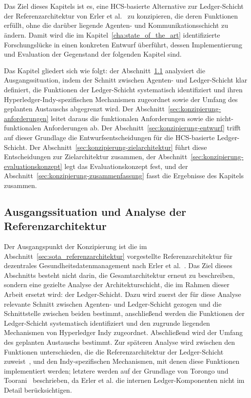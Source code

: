 \chapter{}
\label{cha:konzept}

Das Ziel dieses Kapitels ist es, eine HCS-basierte Alternative zur Ledger-Schicht der Referenzarchitektur von Erler et al.~\cite{erler2023} zu konzipieren, die deren Funktionen erfüllt, ohne die darüber liegende Agenten- und Kommunikationsschicht zu ändern. Damit wird die im Kapitel~\ref{cha:state_of_the_art} identifizierte Forschungslücke in einen konkreten Entwurf überführt, dessen Implementierung und Evaluation der Gegenstand der folgenden Kapitel sind.

Das Kapitel gliedert sich wie folgt: der Abschnitt~\ref{sec:konzipierung-referenzarchitektur} analysiert die Ausgangssituation, indem der Schnitt zwischen Agenten- und Ledger-Schicht klar definiert, die Funktionen der Ledger-Schicht systematisch identifiziert und ihren Hyperledger-Indy-spezifischen Mechanismen zugeordnet sowie der Umfang des geplanten Austauschs abgegrenzt wird. Der Abschnitt~\ref{sec:konzipierung-anforderungen} leitet daraus die funktionalen Anforderungen sowie die nicht-funktionalen Anforderungen ab. Der Abschnitt~\ref{sec:konzipierung-entwurf} trifft auf dieser Grundlage die Entwurfsentscheidungen für die HCS-basierte Ledger-Schicht. Der Abschnitt~\ref{sec:konzipierung-zielarchitektur} führt diese Entscheidungen zur Zielarchitektur zusammen, der Abschnitt~\ref{sec:konzipierung-evaluationskonzept} legt das Evaluationskonzept fest, und der Abschnitt~\ref{sec:konzipierung-zusammenfassung} fasst die Ergebnisse des Kapitels zusammen.

\section{Ausgangssituation und Analyse der Referenzarchitektur}
\label{sec:konzipierung-referenzarchitektur}

Der Ausgangspunkt der Konzipierung ist die im Abschnitt~\ref{sec:sota_referenzarchitektur} vorgestellte Referenzarchitektur für dezentrales Gesundheitsdatenmanagement nach Erler et al.~\cite{erler2023}. Das Ziel dieses Abschnitts besteht nicht darin, die Gesamtarchitektur erneut zu beschreiben, sondern eine gezielte Analyse der Architekturschicht, die im Rahmen dieser Arbeit ersetzt wird: der Ledger-Schicht. Dazu wird zuerst der für diese Analyse relevante Schnitt zwischen Agenten- und Ledger-Schicht gezogen und die Schnittstelle zwischen beiden bestimmt, anschließend werden die Funktionen der Ledger-Schicht systematisch identifiziert und den zugrunde liegenden Mechanismen von Hyperledger Indy zugeordnet. Abschließend wird der Umfang des geplanten Austauschs bestimmt.
Zur späteren Analyse wird zwischen den Funktionen unterschieden, die die Referenzarchitektur der Ledger-Schicht zuweist~\cite{erler2023}, und den Indy-spezifischen Mechanismen, mit denen diese Funktionen implementiert werden; letztere werden auf der Grundlage von Torongo und Toorani~\cite{torongo2023} beschrieben, da Erler et al. die internen Ledger-Komponenten nicht im Detail berücksichtigen.

